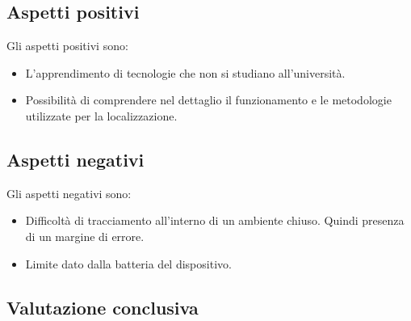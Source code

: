 \subsection{Aspetti positivi}
Gli aspetti positivi sono:
\begin{itemize}
	\item L'apprendimento di tecnologie che non si studiano all'università.
	\item Possibilità di comprendere nel dettaglio il funzionamento e le metodologie utilizzate per la localizzazione.
	
\end{itemize}
\subsection{Aspetti negativi}
Gli aspetti negativi sono:
\begin{itemize}
	\item Difficoltà di tracciamento all'interno di un ambiente chiuso. Quindi presenza di un margine di errore.
	\item Limite dato dalla batteria del dispositivo.
	
\end{itemize}
\subsection{Valutazione conclusiva}

